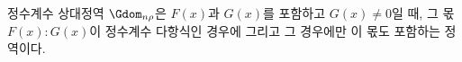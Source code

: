 
정수계수 상대정역 $\Gdom_{n\rho}$은 $F(x)$과 $G(x)$를 포함하고 $G(x)\ne0$일 때, 그 몫 $F(x):G(x)$이 정수계수 다항식인 경우에 그리고 그 경우에만 이 몫도 포함하는 정역이다.
